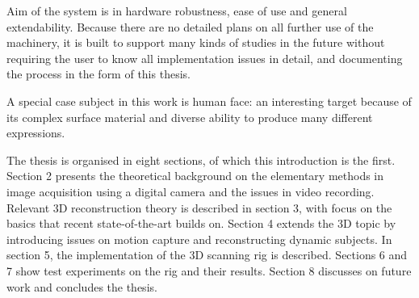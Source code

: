 Aim of the system is in hardware robustness, ease of use and general extendability.
Because there are no detailed plans on all further use of the machinery, it is built to support many kinds of studies in the future without requiring the user to know all implementation issues in detail, and documenting the process in the form of this thesis.

A special case subject in this work is human face: an interesting target because of its complex surface material and diverse ability to produce many different expressions.


The thesis is organised in eight sections, of which this introduction is the first.
Section 2 presents the theoretical background on the elementary methods in image acquisition using a digital camera and the issues in video recording.
Relevant 3D reconstruction theory is described in section 3, with focus on the basics that recent state-of-the-art builds on.
Section 4 extends the 3D topic by introducing issues on motion capture and reconstructing dynamic subjects.
In section 5, the implementation of the 3D scanning rig is described.
Sections 6 and 7 show test experiments on the rig and their results.
Section 8 discusses on future work and concludes the thesis.
